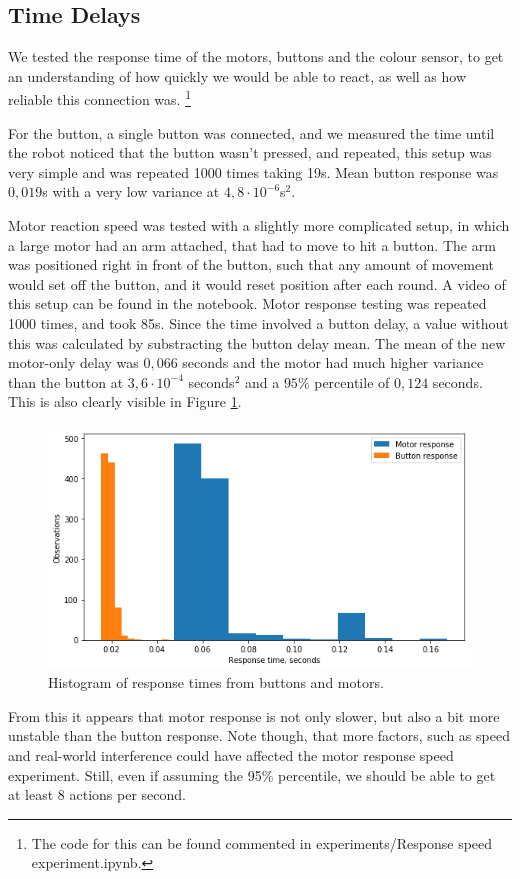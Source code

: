 \documentclass[11pt, a4paper]{article}
\begin{document}
\subsection{Time Delays}

We tested the response time of the motors, buttons and the colour sensor, to get an understanding of how quickly we would be able to react, as well as how reliable this connection was. \footnote{The code for this can be found commented in experiments/Response speed experiment.ipynb.} 

For the button, a single button was connected, and we measured the time until the robot noticed that the button wasn't pressed, and repeated, this setup was very simple and was repeated 1000 times taking 19s. Mean button response was $0,019$s with a very low variance at $4,8\cdot 10^{-6}$s$^2$.

Motor reaction speed was tested with a slightly more complicated setup, in which a large motor had an arm attached, that had to move to hit a button. The arm was positioned right in front of the button, such that any amount of movement would set off the button, and it would reset position after each round. A video of this setup can be found in the notebook. Motor response testing was repeated 1000 times, and took 85s. Since the time involved a button delay, a value without this was calculated by substracting the button delay mean. The mean of the new motor-only delay was $0,066$ seconds and the motor had much higher variance than the button at $3,6\cdot 10^{-4}$ seconds$^2$ and a $95\%$ percentile of $0,124$ seconds. This is also clearly visible in Figure \ref{fig:responsetimemotorbutt}.

\begin{figure}[H]
	\centering
	\includegraphics[scale=0.7]{images/motor_button_response_histogram.png}	
	\caption{Histogram of  response times from buttons and motors.}
	\label{fig:responsetimemotorbutt}
\end{figure} 
From this it appears that motor response is not only slower, but also a bit more unstable than the button response. Note though, that more factors, such as speed and real-world interference could have affected the motor response speed experiment. Still, even if assuming the 95\% percentile, we should be able to get at least 8 actions per second.
\end{document}
